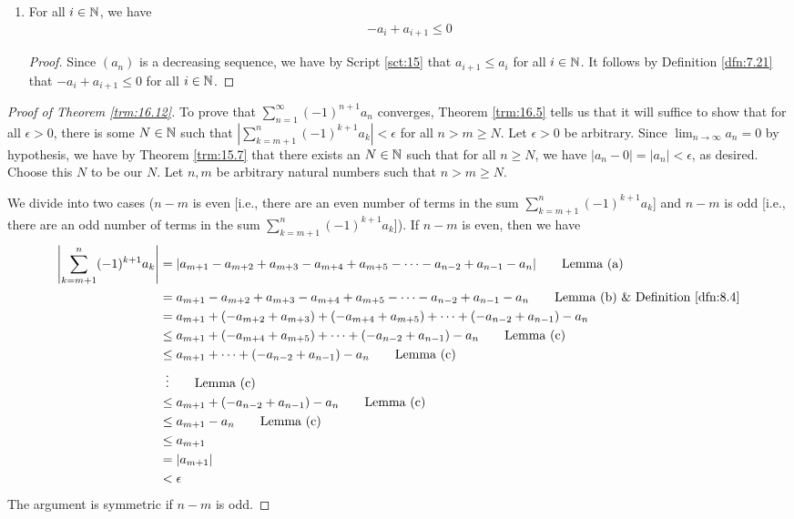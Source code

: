 \documentclass[../main.tex]{subfiles}
\begin{document}
\begin{theorem}
\begin{lemma*}
\begin{enumerate}[label={\textup{(}\alph*\textup{)}}]
\begin{proof}
            \end{proof}
            \item For all $i\in\mathbb{N}$, we have
            \begin{align*}
                -a_i+a_{i+1} \leq 0
            \end{align*}
            \begin{proof}
                Since $(a_n)$ is a decreasing sequence, we have by Script \ref{sct:15} that $a_{i+1}\leq a_i$ for all $i\in\mathbb{N}$. It follows by Definition \ref{dfn:7.21} that $-a_i+a_{i+1}\leq 0$ for all $i\in\mathbb{N}$.
            \end{proof}
        \end{enumerate}
    \end{lemma*}
    \begin{proof}[Proof of Theorem \ref{trm:16.12}]
        To prove that $\sum_{n=1}^\infty(-1)^{n+1}a_n$ converges, Theorem \ref{trm:16.5} tells us that it will suffice to show that for all $\epsilon>0$, there is some $N\in\mathbb{N}$ such that $|\sum_{k=m+1}^n(-1)^{k+1}a_k|<\epsilon$ for all $n>m\geq N$. Let $\epsilon>0$ be arbitrary. Since $\lim_{n\to\infty}a_n=0$ by hypothesis, we have by Theorem \ref{trm:15.7} that there exists an $N\in\mathbb{N}$ such that for all $n\geq N$, we have $|a_n-0|=|a_n|<\epsilon$, as desired. Choose this $N$ to be our $N$. Let $n,m$ be arbitrary natural numbers such that $n>m\geq N$.\par
        We divide into two cases ($n-m$ is even [i.e., there are an even number of terms in the sum $\sum_{k=m+1}^n(-1)^{k+1}a_k$] and $n-m$ is odd [i.e., there are an odd number of terms in the sum $\sum_{k=m+1}^n(-1)^{k+1}a_k$]). If $n-m$ is even, then we have
        \begin{align*}
            \left| \sum_{k=m+1}^n(-1)^{k+1}a_k \right| &= |a_{m+1}-a_{m+2}+a_{m+3}-a_{m+4}+a_{m+5}-\cdots-a_{n-2}+a_{n-1}-a_n|\tag*{Lemma (a)}\\
            &= a_{m+1}-a_{m+2}+a_{m+3}-a_{m+4}+a_{m+5}-\cdots-a_{n-2}+a_{n-1}-a_n\tag*{Lemma (b) \& Definition \ref{dfn:8.4}}\\
            &= a_{m+1}+(-a_{m+2}+a_{m+3})+(-a_{m+4}+a_{m+5})+\cdots+(-a_{n-2}+a_{n-1})-a_n\\
            &\leq a_{m+1}+(-a_{m+4}+a_{m+5})+\cdots+(-a_{n-2}+a_{n-1})-a_n\tag*{Lemma (c)}\\
            &\leq a_{m+1}+\cdots+(-a_{n-2}+a_{n-1})-a_n\tag*{Lemma (c)}\\
            &\hspace{5pt}\vdots\tag*{Lemma (c)}\\
            &\leq a_{m+1}+(-a_{n-2}+a_{n-1})-a_n\tag*{Lemma (c)}\\
            &\leq a_{m+1}-a_n\tag*{Lemma (c)}\\
            &\leq a_{m+1}\\
            &= |a_{m+1}|\\
            &< \epsilon
        \end{align*}
        The argument is symmetric if $n-m$ is odd.
    \end{proof}
\end{theorem}
\end{document}
